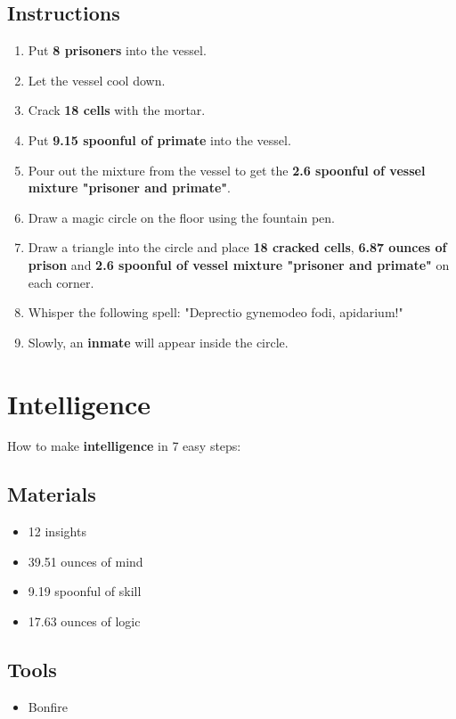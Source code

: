 \documentclass{article}
\begin{document}
\subsection{Instructions}\begin{enumerate}
\item 
Put \textbf{8 prisoners} into the vessel.
\item 
Let the vessel cool down.
\item 
Crack \textbf{18 cells} with the mortar.
\item 
Put \textbf{9.15 spoonful of primate} into the vessel.
\item 
Pour out the mixture from the vessel to get the \textbf{2.6 spoonful of vessel mixture "prisoner and primate"}.
\item 
Draw a magic circle on the floor using the fountain pen.
\item 
Draw a triangle into the circle and place \textbf{18 cracked cells}, \textbf{6.87 ounces of prison} and \textbf{2.6 spoonful of vessel mixture "prisoner and primate"} on each corner.
\item 
Whisper the following spell: "Deprectio gynemodeo fodi, apidarium!"
\item 
Slowly, an \textbf{inmate} will appear inside the circle.
\end{enumerate}
\newpage
\section{Intelligence}How to make \textbf{intelligence} in 7 easy steps:

\subsection{Materials}\begin{itemize}
\item 
12 insights
\item 
39.51 ounces of mind
\item 
9.19 spoonful of skill
\item 
17.63 ounces of logic
\end{itemize}
\subsection{Tools}\begin{itemize}
\item 
Bonfire
\end{itemize}
\end{document}
